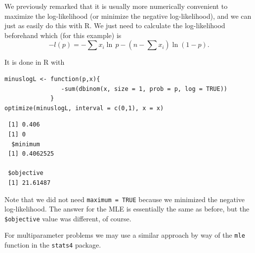 \documentclass[captions=tableheading]{scrbook}
\begin{document}
We previously remarked that it is usually more numerically convenient to maximize the log-likelihood (or minimize the negative log-likelihood), and we can just as easily do this with \textsf{R}. We just need to calculate the log-likelihood beforehand which (for this example) is
\[
-l(p)=-\sum x_{i}\ln\, p-\left(n-\sum x_{i}\right)\ln(1-p).
\]

It is done in \textsf{R} with


\begin{verbatim}
minuslogL <- function(p,x){
                -sum(dbinom(x, size = 1, prob = p, log = TRUE))
             }
optimize(minuslogL, interval = c(0,1), x = x)
\end{verbatim}

\begin{verbatim}
 [1] 0.406
 [1] 0
  $minimum
 [1] 0.4062525
 
 $objective
 [1] 21.61487
\end{verbatim}

Note that we did not need \texttt{maximum = TRUE} because we minimized the negative log-likelihood. The answer for the MLE is essentially the same as before, but the \texttt{\$objective} value was different, of course.

For multiparameter problems we may use a similar approach by way of the \texttt{mle} function in the \texttt{stats4} package. 
\end{document}
